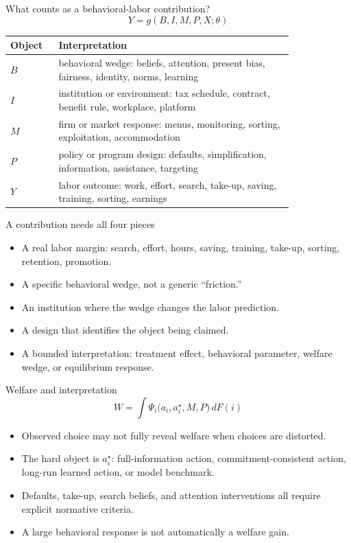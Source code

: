 \documentclass[aspectratio=169,11pt]{beamer}
\begin{document}
\begin{frame}{What counts as a behavioral-labor contribution?}
\[
Y = g(B, I, M, P, X; \theta)
\]

\small
\begin{tabular}{p{0.12\linewidth} p{0.70\linewidth}}
\toprule
Object & Interpretation \\
\midrule
$B$ & behavioral wedge: beliefs, attention, present bias, fairness, identity, norms, learning \\
$I$ & institution or environment: tax schedule, contract, benefit rule, workplace, platform \\
$M$ & firm or market response: menus, monitoring, sorting, exploitation, accommodation \\
$P$ & policy or program design: defaults, simplification, information, assistance, targeting \\
$Y$ & labor outcome: work, effort, search, take-up, saving, training, sorting, earnings \\
\bottomrule
\end{tabular}
\end{frame}

\begin{frame}{A contribution needs all four pieces}
\begin{itemize}
    \item A real labor margin: search, effort, hours, saving, training, take-up, sorting, retention, promotion.
    \item A specific behavioral wedge, not a generic ``friction.''
    \item An institution where the wedge changes the labor prediction.
    \item A design that identifies the object being claimed.
    \item A bounded interpretation: treatment effect, behavioral parameter, welfare wedge, or equilibrium response.
\end{itemize}
\end{frame}

\begin{frame}{Welfare and interpretation}
\[
W = \int \Psi_i\big(a_i, a_i^\star, M, P\big)\, dF(i)
\]

\begin{itemize}
    \item Observed choice may not fully reveal welfare when choices are distorted.
    \item The hard object is $a_i^\star$: full-information action, commitment-consistent action, long-run learned action, or model benchmark.
    \item Defaults, take-up, search beliefs, and attention interventions all require explicit normative criteria.
    \item A large behavioral response is not automatically a welfare gain.
\end{itemize}
\end{frame}
\end{document}
